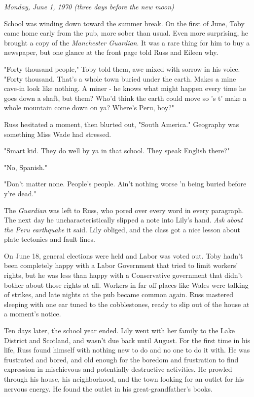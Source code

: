\documentclass[a4paper,11pt]{article}
\begin{document}
\emph{Monday, June 1, 1970 (three days before the new moon)}

School was winding down toward the summer break. On the first of June, Toby came home early from the pub, more sober than usual. Even more surprising, he brought a copy of the \emph{Manchester Guardian}. It was a rare thing for him to buy a newspaper, but one glance at the front page told Russ and Eileen why.

"Forty thousand people," Toby told them, awe mixed with sorrow in his voice. "Forty thousand. That's a whole town buried under the earth. Makes a mine cave-in look like nothing. A miner - he knows what might happen every time he goes down a shaft, but them? Who'd think the earth could move so 's t' make a whole mountain come down on ya? Where's Peru, boy?"

Russ hesitated a moment, then blurted out, "South America." Geography was something Miss Wade had stressed.

"Smart kid. They do well by ya in that school. They speak English there?"

"No, Spanish."

"Don't matter none. People's people. Ain't nothing worse 'n being buried before y're dead."

The \emph{Guardian} was left to Russ, who pored over every word in every paragraph. The next day he uncharacteristically slipped a note into Lily's hand. \emph{Ask about the Peru earthquake} it said. Lily obliged, and the class got a nice lesson about plate tectonics and fault lines.

On June 18, general elections were held and Labor was voted out. Toby hadn't been completely happy with a Labor Government that tried to limit workers' rights, but he was less than happy with a Conservative government that didn't bother about those rights at all. Workers in far off places like Wales were talking of strikes, and late nights at the pub became common again. Russ mastered sleeping with one ear tuned to the cobblestones, ready to slip out of the house at a moment's notice.

Ten days later, the school year ended. Lily went with her family to the Lake District and Scotland, and wasn't due back until August. For the first time in his life, Russ found himself with nothing new to do and no one to do it with. He was frustrated and bored, and old enough for the boredom and frustration to find expression in mischievous and potentially destructive activities. He prowled through his house, his neighborhood, and the town looking for an outlet for his nervous energy. He found the outlet in his great-grandfather's books.
\end{document}
